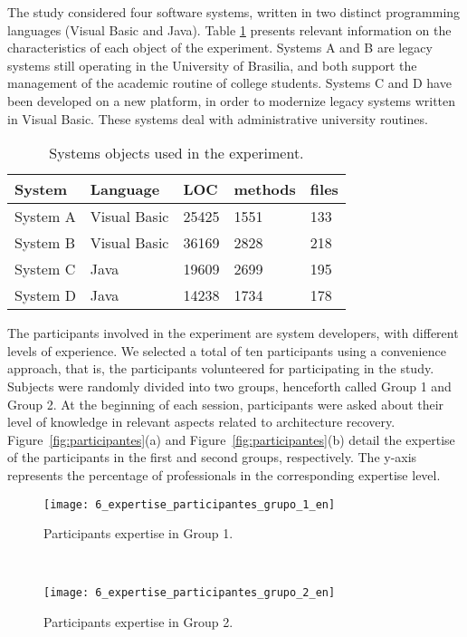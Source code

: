 The study considered four software systems, written in two distinct programming languages (Visual Basic and Java). Table \ref{tabelaSistemasObjetos}  presents relevant information on the characteristics of each object of the experiment. Systems A 
and B are legacy systems still operating in the University of Brasilia, 
and both support the management of the academic routine of college students. 
Systems C and D have been developed on a new platform, in order 
to modernize legacy systems written in Visual Basic. These systems 
deal with administrative university routines.

\begin{table}[h]
	\centering
	\caption{Systems objects used in the experiment.}
	\label{tabelaSistemasObjetos}
	\begin{tabular}{|lllll|}
		\hline
		System  & Language    & LOC   &  methods & files  \\ \hline
		System A             & Visual Basic & 25425 & 1551       & 133        \\
		System B           & Visual Basic & 36169 & 2828       & 218        \\
		System C            & Java         & 19609 & 2699       & 195        \\
		System D           & Java         & 14238 & 1734       & 178        \\ \hline
	\end{tabular}
\end{table}


The participants involved in the experiment are system developers, with different levels of experience. We selected a total of ten participants using a convenience approach, that is, the participants volunteered for participating in the study. Subjects were randomly divided into two groups, henceforth called Group 1 and Group 2. At the beginning of each session, participants were asked about their level of knowledge in relevant aspects related to architecture recovery. Figure~\ref{fig:participantes}(a) and Figure~\ref{fig:participantes}(b) 
detail the expertise of the participants in the first and second groups, respectively. 
The y-axis represents the percentage of professionals in the corresponding expertise level.

\begin{figure*}[t!]
 \begin{subfigure}[t]{0.5\textwidth}
	\centering
	\texttt{[image: 6\_expertise\_participantes\_grupo\_1\_en]}
	\caption{Participants expertise in Group 1.}
 \end{subfigure}
 ~
 \begin{subfigure}[t]{0.5\textwidth}
	\centering
	\texttt{[image: 6\_expertise\_participantes\_grupo\_2\_en]}
	\caption{Participants expertise in Group 2.}
 \end{subfigure}
\caption{Expertise of the participants.}
\label{fig:participantes}
\end{figure*}

